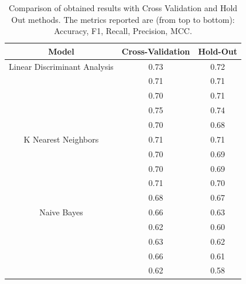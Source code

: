                 \begin{table}[htbp]
                    \centering
                    \begin{tabular}{|c|c|c|}
                    \hline
                    \textbf{Model} & \textbf{Cross-Validation} & \textbf{Hold-Out} \\ \hline
                        Linear Discriminant Analysis    & 0.73 & 0.72 \\ 
                                                        & 0.71 & 0.71 \\ 
                                                        & 0.70 & 0.71 \\ 
                                                        & 0.75 & 0.74 \\
                                                        & 0.70 & 0.68 \\ 
                                                        \hline
                        K Nearest Neighbors             & 0.71 & 0.71 \\ 
                                                        & 0.70 & 0.69 \\ 
                                                        & 0.70 & 0.69 \\ 
                                                        & 0.71 & 0.70 \\
                                                        & 0.68 & 0.67 \\
                                                        \hline
                        Naive Bayes                     & 0.66 & 0.63 \\ 
                                                        & 0.62 & 0.60 \\ 
                                                        & 0.63 & 0.62 \\
                                                        & 0.66 & 0.61 \\ 
                                                        & 0.62 & 0.58 \\ 
                                                        \hline
                    \end{tabular}
                    \caption{Comparison of obtained results with Cross Validation and Hold Out methods. The metrics reported are (from top to bottom): Accuracy, F1, Recall, Precision, MCC.}
                    \label{tab:correct_approach_cv}
                \end{table}
                
